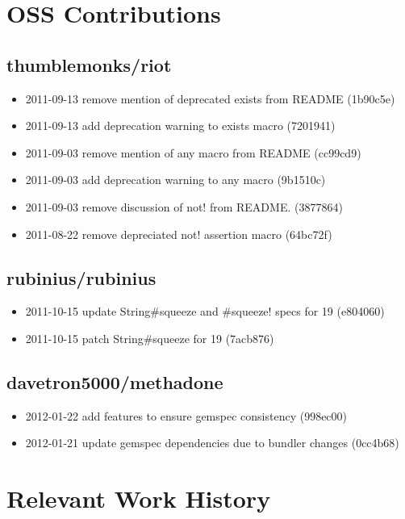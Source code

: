 \documentclass{article}
\begin{document}
\section{OSS Contributions} %
\label{sec:OSS Contributions}
  \subsection{thumblemonks/riot} %
  \label{sub:thumblemonks/riot}

  \begin{itemize}
    \item2011-09-13 remove mention of deprecated exists from README (1b90c5e)
    \item2011-09-13 add deprecation warning to exists macro (7201941)
    \item2011-09-03 remove mention of any macro from README (cc99cd9)
    \item2011-09-03 add deprecation warning to any macro (9b1510c)
    \item2011-09-03 remove discussion of not! from README. (3877864)
    \item2011-08-22 remove depreciated not! assertion macro (64bc72f)
  \end{itemize}

  \subsection{rubinius/rubinius} %
  \label{sub:rubinius/rubinius}

  \begin{itemize}
    \item2011-10-15 update String#squeeze and #squeeze! specs for 19 (e804060)
    \item2011-10-15 patch String#squeeze for 19 (7acb876)
  \end{itemize}
  
  \subsection{davetron5000/methadone} %
  \label{sub:davetron5000/methadone}
  
  \begin{itemize}
    \item2012-01-22 add features to ensure gemspec consistency (998ec00)
    \item2012-01-21 update gemspec dependencies due to bundler changes (0cc4b68)
  \end{itemize}


\section{Relevant Work History} %
\label{sec:Relevant Work History}
\end{document}

